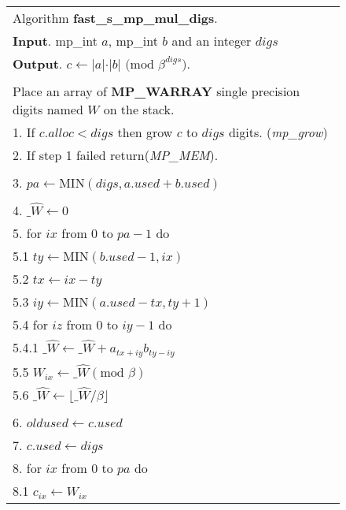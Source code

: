 \documentclass[b5paper]{book}
\begin{document}
\newpage\begin{figure}[!here]
\begin{small}
\begin{center}
\begin{tabular}{l}
\hline Algorithm \textbf{fast\_s\_mp\_mul\_digs}. \\
\textbf{Input}.   mp\_int $a$, mp\_int $b$ and an integer $digs$ \\
\textbf{Output}.  $c \leftarrow \vert a \vert \cdot \vert b \vert \mbox{ (mod }\beta^{digs}\mbox{)}$. \\
\hline \\
Place an array of \textbf{MP\_WARRAY} single precision digits named $W$ on the stack. \\
1.  If $c.alloc < digs$ then grow $c$ to $digs$ digits. (\textit{mp\_grow}) \\
2.  If step 1 failed return(\textit{MP\_MEM}).\\
\\
3.  $pa \leftarrow \mbox{MIN}(digs, a.used + b.used)$ \\
\\
4.  $\_ \hat W \leftarrow 0$ \\
5.  for $ix$ from 0 to $pa - 1$ do \\
\hspace{3mm}5.1  $ty \leftarrow \mbox{MIN}(b.used - 1, ix)$ \\
\hspace{3mm}5.2  $tx \leftarrow ix - ty$ \\
\hspace{3mm}5.3  $iy \leftarrow \mbox{MIN}(a.used - tx, ty + 1)$ \\
\hspace{3mm}5.4  for $iz$ from 0 to $iy - 1$ do \\
\hspace{6mm}5.4.1  $\_ \hat W \leftarrow \_ \hat W + a_{tx+iy}b_{ty-iy}$ \\
\hspace{3mm}5.5  $W_{ix} \leftarrow \_ \hat W (\mbox{mod }\beta)$\\
\hspace{3mm}5.6  $\_ \hat W \leftarrow \lfloor \_ \hat W / \beta \rfloor$ \\
\\
6.  $oldused \leftarrow c.used$ \\
7.  $c.used \leftarrow digs$ \\
8.  for $ix$ from $0$ to $pa$ do \\
\hspace{3mm}8.1  $c_{ix} \leftarrow W_{ix}$ \\

\end{tabular}
\end{center}
\end{small}
\end{figure}
\end{document}

